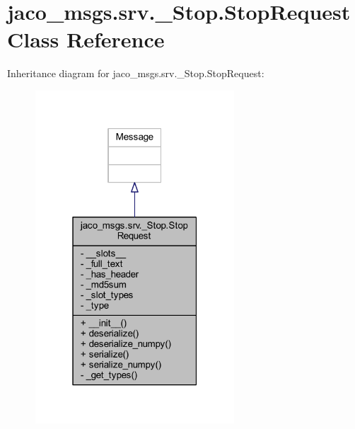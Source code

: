 \hypertarget{classjaco__msgs_1_1srv_1_1__Stop_1_1StopRequest}{}\section{jaco\+\_\+msgs.\+srv.\+\_\+\+Stop.\+Stop\+Request Class Reference}
\label{classjaco__msgs_1_1srv_1_1__Stop_1_1StopRequest}


Inheritance diagram for jaco\+\_\+msgs.\+srv.\+\_\+\+Stop.\+Stop\+Request\+:
\nopagebreak
\begin{figure}[H]
\begin{center}
\leavevmode
\includegraphics[width=211pt]{d6/d7a/classjaco__msgs_1_1srv_1_1__Stop_1_1StopRequest__inherit__graph}
\end{center}
\end{figure}


